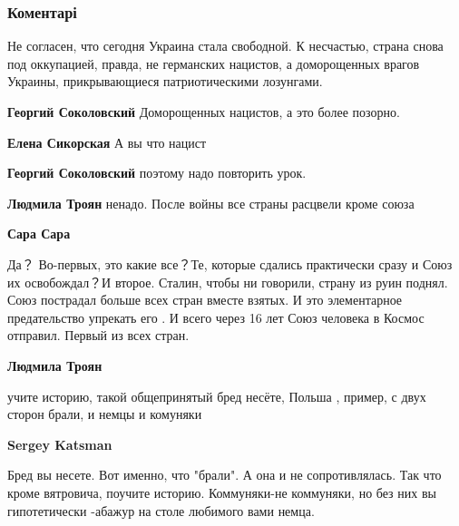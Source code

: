  
 
 
 
 
\subsubsection{Коментарі}

\begin{itemize} %

Не согласен, что сегодня Украина стала свободной. К несчастью, страна снова под
оккупацией, правда, не германских нацистов, а доморощенных врагов Украины,
прикрывающиеся патриотическими лозунгами.

\begin{itemize} %
\textbf{Георгий Соколовский} Доморощенных нацистов, а это более позорно.

\textbf{Елена Сикорская} А вы что нацист

\textbf{Георгий Соколовский} поэтому надо повторить урок.

\begin{itemize} %
\textbf{Людмила Троян} ненадо. После войны все страны расцвели кроме союза

\textbf{Сара Сара} 

Да？ Во-первых, это какие все？Те, которые сдались практически сразу и Союз их
освобождал？И второе. Сталин, чтобы ни говорили, страну из руин поднял. Союз
пострадал больше всех стран вместе взятых. И это элементарное предательство
упрекать его . И всего через 16 лет Союз человека в Космос отправил. Первый из
всех стран.

\textbf{Людмила Троян} 

учите историю, такой общепринятый бред несёте, Польша , пример, с двух сторон
брали, и немцы и комуняки

\textbf{Sergey Katsman} 

Бред вы несете. Вот именно, что "брали". А она и не сопротивлялась. Так что
кроме вятровича, поучите историю. Коммуняки-не коммуняки, но без них вы
гипотетически -абажур на столе любимого вами немца.


\end{itemize}
\end{itemize}
\end{itemize}
